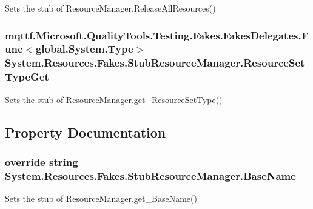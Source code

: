 Sets the stub of Resource\-Manager.\-Release\-All\-Resources()

\hypertarget{class_system_1_1_resources_1_1_fakes_1_1_stub_resource_manager_a69b2fec4e7ba8835e67af15dbbfedb1e}{
\subsubsection[{Resource\-Set\-Type\-Get}]{\setlength{\rightskip}{0pt plus 5cm}mqttf.\-Microsoft.\-Quality\-Tools.\-Testing.\-Fakes.\-Fakes\-Delegates.\-Func$<$global.\-System.\-Type$>$ System.\-Resources.\-Fakes.\-Stub\-Resource\-Manager.\-Resource\-Set\-Type\-Get}}\label{class_system_1_1_resources_1_1_fakes_1_1_stub_resource_manager_a69b2fec4e7ba8835e67af15dbbfedb1e}


Sets the stub of Resource\-Manager.\-get\-\_\-\-Resource\-Set\-Type()



\subsection{Property Documentation}
\hypertarget{class_system_1_1_resources_1_1_fakes_1_1_stub_resource_manager_a913da0855076dfbce9d74312c8abee49}{
\subsubsection[{Base\-Name}]{\setlength{\rightskip}{0pt plus 5cm}override string System.\-Resources.\-Fakes.\-Stub\-Resource\-Manager.\-Base\-Name\hspace{0.3cm}{\ttfamily [get]}}}\label{class_system_1_1_resources_1_1_fakes_1_1_stub_resource_manager_a913da0855076dfbce9d74312c8abee49}


Sets the stub of Resource\-Manager.\-get\-\_\-\-Base\-Name()

